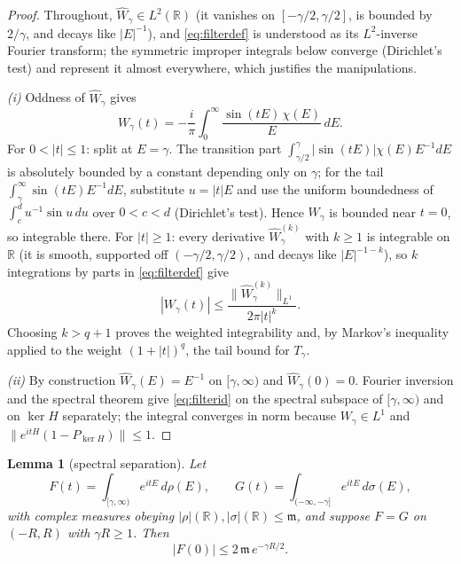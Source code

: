 \documentclass[11pt,a4paper]{article}
\theoremstyle{plain}
\newtheorem{lemma}[theorem]{Lemma}
\theoremstyle{definition}
\theoremstyle{plain}
\theoremstyle{definition}
\newcommand{\R}{\mathbb{R}}
\begin{document}
\begin{proof}
Throughout, $\widehat W_\gamma\in L^2(\R)$ (it vanishes on
$[-\gamma/2,\gamma/2]$, is bounded by $2/\gamma$, and decays like $|E|^{-1}$), and
\eqref{eq:filterdef} is understood as its $L^2$-inverse Fourier transform; the symmetric
improper integrals below converge (Dirichlet's test) and represent it almost everywhere,
which justifies the manipulations.

\emph{(i)} Oddness of $\widehat W_\gamma$ gives
\[
 W_\gamma(t)=-\frac{i}{\pi}\int_0^\infty\frac{\sin(tE)\,\chi(E)}E\,dE .
\]
For $0<|t|\le1$: split at $E=\gamma$. The transition part
$\int_{\gamma/2}^{\gamma}|\sin(tE)|\chi(E)E^{-1}dE$ is absolutely bounded by a constant
depending only on $\gamma$; for the tail $\int_\gamma^\infty\sin(tE)E^{-1}dE$, substitute
$u=|t|E$ and use the uniform boundedness of $\int_c^d u^{-1}\sin u\,du$ over
$0<c<d$ (Dirichlet's test). Hence $W_\gamma$ is bounded near $t=0$, so integrable there.
For $|t|\ge1$: every derivative $\widehat W_\gamma^{(k)}$ with $k\ge1$ is integrable on
$\R$ (it is smooth, supported off $(-\gamma/2,\gamma/2)$, and decays like $|E|^{-1-k}$),
so $k$ integrations by parts in \eqref{eq:filterdef} give
\[
 |W_\gamma(t)|\le\frac{\|\widehat W_\gamma^{(k)}\|_{L^1}}{2\pi|t|^{k}} .
\]
Choosing $k>q+1$ proves the weighted integrability and, by Markov's inequality applied to
the weight $(1+|t|)^q$, the tail bound for $T_\gamma$.

\emph{(ii)} By construction $\widehat W_\gamma(E)=E^{-1}$ on $[\gamma,\infty)$ and
$\widehat W_\gamma(0)=0$. Fourier inversion and the spectral theorem give
\eqref{eq:filterid} on the spectral subspace of $[\gamma,\infty)$ and on $\ker H$
separately; the integral converges in norm because $W_\gamma\in L^1$ and
$\|e^{itH}(1-P_{\ker H})\|\le1$.
\end{proof}

\begin{lemma}[spectral separation]\label{lem:separation}
Let
\[
 F(t)=\int_{[\gamma,\infty)}e^{itE}\,d\rho(E),\qquad
 G(t)=\int_{(-\infty,-\gamma]}e^{itE}\,d\sigma(E),
\]
with complex measures obeying $|\rho|(\R),|\sigma|(\R)\le\mathfrak m$, and suppose
$F=G$ on $(-R,R)$ with $\gamma R\ge1$. Then
\begin{equation}
 |F(0)|\le2\,\mathfrak m\,e^{-\gamma R/2} .
 \label{eq:sep}
\end{equation}
\end{lemma}
\end{document}
